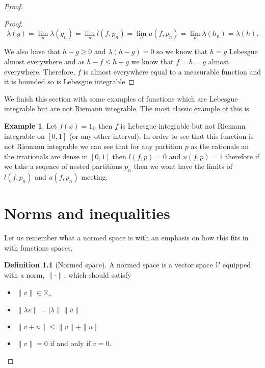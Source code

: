 \documentclass[
]{book}
\providecommand{\tightlist}{%
  \setlength{\itemsep}{0pt}\setlength{\parskip}{0pt}}
\theoremstyle{definition}
\newtheorem{definition}{Definition}[chapter]
\theoremstyle{definition}
\newtheorem{example}{Example}[chapter]
\theoremstyle{definition}
\theoremstyle{definition}
\theoremstyle{remark}
\begin{document}
\begin{proof}
\begin{proof}
\[ \lambda (g) = \lim_n \lambda(g_n) = \lim_n l(f,p_n) = \lim_n u(f,p_n) = \lim_n \lambda(h_n) = \lambda(h). \]

We also have that \(h-g \geq 0\) and \(\lambda(h-g) = 0\) so we know that \(h=g\) Lebesgue almost everywhere and as \(h-f \leq h-g\) we know that \(f=h=g\) almost everywhere. Therefore, \(f\) is almost everywhere equal to a measurable function and it is bounded so is Lebesgue integrable
\end{proof}

We finish this section with some examples of functions which are Lebesgue integrable but are not Riemann integrable. The most classic example of this is

\begin{example}
Let \(f(x) = 1_\mathbb{Q}\) then \(f\) is Lebesgue integrable but not Riemann integrable on \([0,1]\) (or any other interval). In order to see that this function is not Riemann integrable we can see that for any partition \(p\) as the rationals an the irrationals are dense in \([0,1]\) then \(l(f,p) =0\) and \(u(f,p) =1\) therefore if we take a seqence of nested partitions \(p_n\) then we wont have the limits of \(l(f,p_n)\) and \(u(f,p_n)\) meeting.
\end{example}

\hypertarget{norms-and-inequalities}{%
\chapter{Norms and inequalities}\label{norms-and-inequalities}}

Let us remember what a normed space is with an emphasis on how this fits in with functions spaces.

\begin{definition}[Normed space]

A normed space is a vector space \(\mathcal{V}\) equipped with a norm, \(\|\cdot\|\), which should satisfy

\begin{itemize}
\tightlist
\item
  \(\| v\| \in \mathbb{R}_+\)
\item
  \(\| \lambda v\| = |\lambda\| \|v\|\)
\item
  \(\|v+u\| \leq \|v\| + \|u\|\)
\item
  \(\|v\|=0\) if and only if \(v=0\).
\end{itemize}

\end{definition}


\end{proof}
\end{document}
